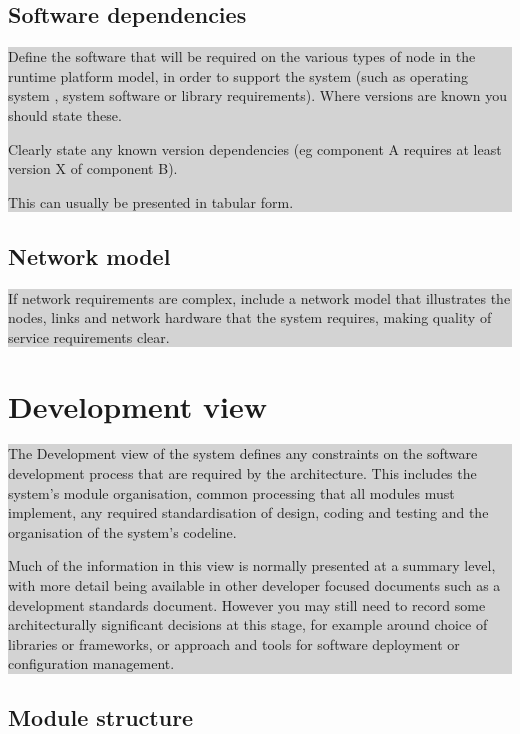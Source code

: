 \documentclass[a4paper,11pt]{report}
\newcommand{\instructions}[1]{
  \noindent\colorbox{lightgray}{%
    \parbox{\linewidth}{%
      #1
    }%
  }%
 \vspace{0.1cm}
}
\begin{document}
\subsection{Software dependencies}
\label{sec:softw-depend}

\instructions{
Define the software that will be required on the various types of node
in the runtime platform model, in order to support the system (such as
operating system , system software or library requirements). Where
versions are known you should state these.

Clearly state any known version dependencies (eg component A requires
at least version X of component B).

This can usually be presented in tabular form.
}

\subsection{Network model}
\label{sec:network-model}

\instructions{
If network requirements are complex, include a network model that
illustrates the nodes, links and network hardware that the system
requires, making quality of service requirements clear.
}

\section{Development view}
\label{sec:development-view}

\instructions{
The Development view of the system defines any constraints on the
software development process that are required by the
architecture. This includes the system’s module organisation, common
processing that all modules must implement, any required
standardisation of design, coding and testing and the organisation of
the system’s codeline.

Much of the information in this view is normally presented at a
summary level, with more detail being available in other developer
focused documents such as a development standards document. However
you may still need to record some architecturally significant
decisions at this stage, for example around choice of libraries or
frameworks, or approach and tools for software deployment or
configuration management.
}

\subsection{Module structure}
\label{sec:module-structure}
\end{document}
